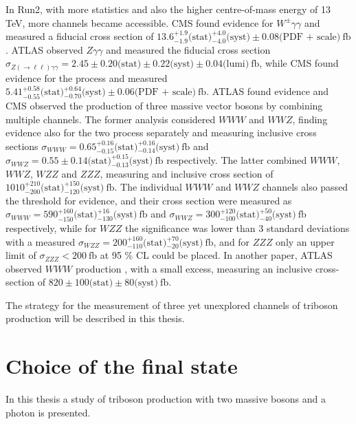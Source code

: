 In Run2, with more statistics and also the higher centre-of-mass energy of 13 TeV, more channels became accessible.
CMS found evidence for $W^\pm\gamma\gamma$ \cite{SMP-19-013} and measured a fiducial cross section of
$13.6^{+1.9}_{-1.9} \text{(stat)} {}^{+4.0}_{-4.0} \text{(syst)} \pm 0.08 \text{(PDF + scale)}~\text{fb}$.
ATLAS observed $Z\gamma\gamma$ \cite{STDM-2021-09} and measured the fiducial cross section $\sigma_{Z(\rightarrow \ell\ell)\gamma\gamma} = 2.45 \pm 0.20 \text{(stat)} \pm 0.22 \text{(syst)} \pm 0.04 \text{(lumi)}~\text{fb}$,
while CMS found evidence for the process \cite{SMP-19-013} and measured $5.41^{+0.58}_{-0.55} \text{(stat)} {}^{+0.64}_{-0.70} \text{(syst)} \pm 0.06 \text{(PDF + scale)}~\text{fb}$.
ATLAS found evidence \cite{STDM-2017-22} and CMS observed \cite{SMP-19-014} the production of three massive vector bosons by combining multiple channels.
The former analysis considered $WWW$ and $WWZ$, finding evidence also for the two process separately and measuring inclusive cross sections
$\sigma_{WWW} = 0.65^{+0.16}_{-0.15} \text{(stat)} {}^{+0.16}_{-0.14} \text{(syst)}~\text{fb}$ and
$\sigma_{WWZ} = 0.55 \pm 0.14 \text{(stat)} {}^{+0.15}_{-0.13} \text{(syst)}~\text{fb}$ respectively.
The latter combined $WWW$, $WWZ$, $WZZ$ and $ZZZ$, measuring and inclusive cross section of $1010^{+210}_{-200}\text{(stat)}{}^{+150}_{-120}\text{(syst)}~\text{fb}$.
The individual $WWW$ and $WWZ$ channels also passed the threshold for evidence, and their cross section were measured as
$\sigma_{WWW} = 590 ^{+160}_{-150} \text{(stat)} {}^{+16}_{-130} \text{(syst)}~\text{fb}$ and
$\sigma_{WWZ} = 300 ^{+120}_{-100} \text{(stat)} {}^{+50}_{-40 } \text{(syst)}~\text{fb}$ respectively,
while for $WZZ$ the significance was lower than 3 standard deviations with a measured
$\sigma_{WZZ} = 200 ^{+160}_{-110} \text{(stat)} {}^{+70}_{-20 } \text{(syst)}~\text{fb}$,
and for $ZZZ$ only an upper limit of $\sigma_{ZZZ} < 200~\text{fb}$ at 95 \% CL could be placed.
In another paper, ATLAS observed $WWW$ production \cite{HDBS-2019-16}, with a small excess, measuring an inclusive cross-section of $820 \pm 100 \text{(stat)} \pm 80 \text{(syst)}~\text{fb}$.

The strategy for the measurement of three yet unexplored channels of triboson production will be described in this thesis.

\section{Choice of the final state}
In this thesis a study of triboson production with two massive bosons and a photon is presented.


